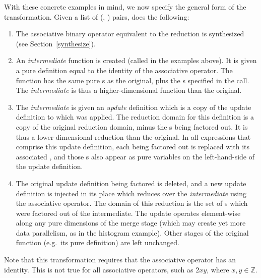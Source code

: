 With these concrete examples in mind, we now specify the general form of the transformation. Given a list of (, ) pairs,  does the following:

\begin{enumerate}
\item The associative binary operator equivalent to the reduction is synthesized (see Section~\ref{synthesize}).
\item An \emph{intermediate} function is created (called  in the examples above). It is given a pure definition equal to the identity of the associative operator. The function has the same pure s as the original, plus the s specified in the  call. The \emph{intermediate} is thus a higher-dimensional function than the original.
\item The \emph{intermediate} is given an \emph{update} definition which is a copy of the update definition to which  was applied. The reduction domain for this definition is a copy of the original reduction domain, minus the s being factored out. It is thus a lower-dimensional reduction than the original. In all expressions that comprise this update definition, each  being factored out is replaced with its associated , and those s also appear as pure variables on the left-hand-side of the update definition.
\item The original update definition being factored is deleted, and a new update definition is injected in its place which reduces over the \emph{intermediate} using the associative operator. The domain of this reduction is the set of s which were factored out of the intermediate. The update operates element-wise along any pure dimensions of the merge stage (which may create yet more data parallelism, as in the histogram example). Other stages of the original function (e.g.\ its pure definition) are left unchanged.
\end{enumerate}

Note that this transformation requires that the associative operator has an identity. This is not true for all associative operators, such as $2xy$, where $x, y \in \mathds{Z}$.

